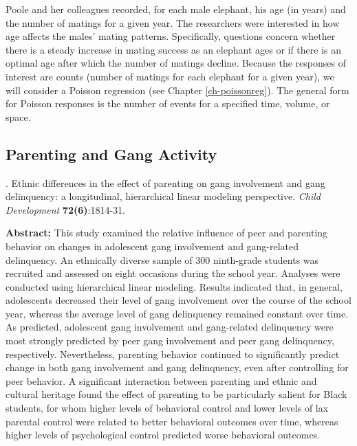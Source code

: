 \documentclass[
]{krantz}
\renewenvironment{quote}{\begin{VF}}{\end{VF}}
\begin{document}
Poole and her colleagues recorded, for each male elephant, his age (in years) and the number of matings for a given year. The researchers were interested in how age affects the males' mating patterns. Specifically, questions concern whether there is a steady increase in mating success as an elephant ages or if there is an optimal age after which the number of matings decline. Because the responses of interest are counts (number of matings for each elephant for a given year), we will consider a Poisson regression (see Chapter \ref{ch-poissonreg}). The general form for Poisson responses is the number of events for a specified time, volume, or space.

\hypertarget{parenting-and-gang-activity}{%
\subsection{Parenting and Gang Activity}\label{parenting-and-gang-activity}}

\citet{Walker-Barnes2001} . Ethnic differences in the effect of parenting on gang involvement and gang delinquency: a longitudinal, hierarchical linear modeling perspective. \emph{Child Development} \textbf{72(6)}:1814-31.

\begin{quote}
\textbf{Abstract:} This study examined the relative influence of peer and parenting behavior on changes in adolescent gang involvement and gang-related delinquency. An ethnically diverse sample of 300 ninth-grade students was recruited and assessed on eight occasions during the school year. Analyses were conducted using hierarchical linear modeling. Results indicated that, in general, adolescents decreased their level of gang involvement over the course of the school year, whereas the average level of gang delinquency remained constant over time. As predicted, adolescent gang involvement and gang-related delinquency were most strongly predicted by peer gang involvement and peer gang delinquency, respectively. Nevertheless, parenting behavior continued to significantly predict change in both gang involvement and gang delinquency, even after controlling for peer behavior. A significant interaction between parenting and ethnic and cultural heritage found the effect of parenting to be particularly salient for Black students, for whom higher levels of behavioral control and lower levels of lax parental control were related to better behavioral outcomes over time, whereas higher levels of psychological control predicted worse behavioral outcomes.
\end{quote}
\end{document}
